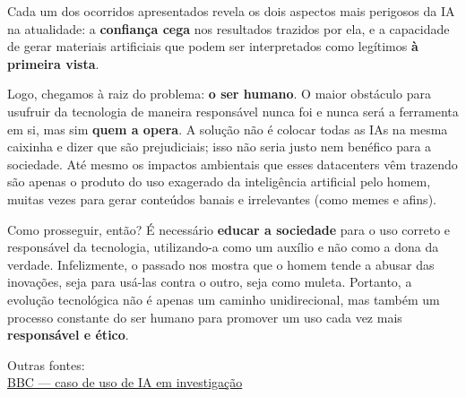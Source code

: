 {Cada um dos ocorridos apresentados revela os dois aspectos mais perigosos da IA na atualidade: a \textbf{confiança cega} nos resultados trazidos por ela, e a capacidade de gerar materiais artificiais que podem ser interpretados como legítimos \textbf{à primeira vista}.\par

Logo, chegamos à raiz do problema: \textbf{o ser humano}. O maior obstáculo para usufruir da tecnologia de maneira responsável nunca foi e nunca será a ferramenta em si, mas sim \textbf{quem a opera}. A solução não é colocar todas as IAs na mesma caixinha e dizer que são prejudiciais; isso não seria justo nem benéfico para a sociedade. Até mesmo os impactos ambientais que esses datacenters vêm trazendo são apenas o produto do uso exagerado da inteligência artificial pelo homem, muitas vezes para gerar conteúdos banais e irrelevantes (como memes e afins).\par

Como prosseguir, então? É necessário \textbf{educar a sociedade} para o uso correto e responsável da tecnologia, utilizando-a como um auxílio e não como a dona da verdade. Infelizmente, o passado nos mostra que o homem tende a abusar das inovações, seja para usá-las contra o outro, seja como muleta. Portanto, a evolução tecnológica não é apenas um caminho unidirecional, mas também um processo constante do ser humano para promover um uso cada vez mais \textbf{responsável e ético}.\par

\highlight{
    \begin{center}
    \textcolor{HypePurple}{Seja responsável com a tecnologia!}\\
    \end{center}
}


\textcolor{HypePurple2}{Outras fontes:}\\
\href{https://www.bbc.com/news/articles/c7vgq5mgz2mo}{BBC — caso de uso de IA em investigação}


}